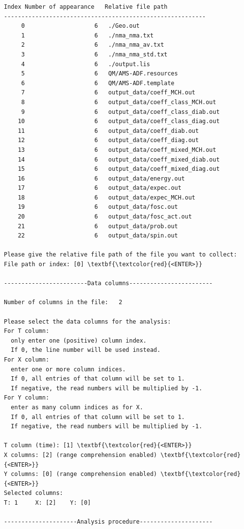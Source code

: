 \documentclass[a4paper,11pt,DIV=15,openany]{scrbook}
\begin{document}
\begin{oframed}
\begin{Verbatim}[commandchars=\\\{\}]
 Index Number of appearance   Relative file path
----------------------------------------------------------
     0                    6   ./Geo.out
     1                    6   ./nma_nma.txt
     2                    6   ./nma_nma_av.txt
     3                    6   ./nma_nma_std.txt
     4                    6   ./output.lis
     5                    6   QM/AMS-ADF.resources
     6                    6   QM/AMS-ADF.template
     7                    6   output_data/coeff_MCH.out
     8                    6   output_data/coeff_class_MCH.out
     9                    6   output_data/coeff_class_diab.out
    10                    6   output_data/coeff_class_diag.out
    11                    6   output_data/coeff_diab.out
    12                    6   output_data/coeff_diag.out
    13                    6   output_data/coeff_mixed_MCH.out
    14                    6   output_data/coeff_mixed_diab.out
    15                    6   output_data/coeff_mixed_diag.out
    16                    6   output_data/energy.out
    17                    6   output_data/expec.out
    18                    6   output_data/expec_MCH.out
    19                    6   output_data/fosc.out
    20                    6   output_data/fosc_act.out
    21                    6   output_data/prob.out
    22                    6   output_data/spin.out

Please give the relative file path of the file you want to collect:
File path or index: [0] \textbf{\textcolor{red}{<ENTER>}}

------------------------Data columns------------------------

Number of columns in the file:   2

Please select the data columns for the analysis:
For T column: 
  only enter one (positive) column index. 
  If 0, the line number will be used instead.
For X column: 
  enter one or more column indices. 
  If 0, all entries of that column will be set to 1. 
  If negative, the read numbers will be multiplied by -1.
For Y column: 
  enter as many column indices as for X. 
  If 0, all entries of that column will be set to 1. 
  If negative, the read numbers will be multiplied by -1.

T column (time): [1] \textbf{\textcolor{red}{<ENTER>}}
X columns: [2] (range comprehension enabled) \textbf{\textcolor{red}{<ENTER>}}
Y columns: [0] (range comprehension enabled) \textbf{\textcolor{red}{<ENTER>}}
Selected columns:
T: 1     X: [2]    Y: [0]

---------------------Analysis procedure---------------------


\end{Verbatim}
\end{oframed}
\end{document}
